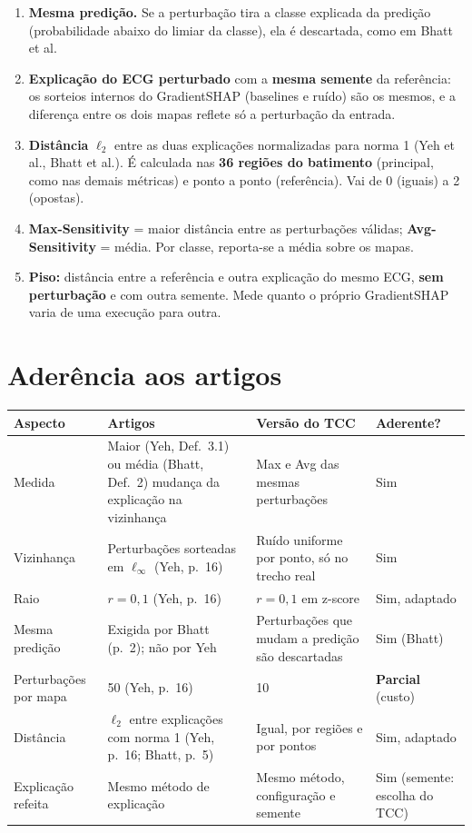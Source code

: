 \documentclass[11pt,a4paper]{article}
\begin{document}
\begin{enumerate}
\item \textbf{Mesma predição.} Se a perturbação tira a classe explicada da predição (probabilidade abaixo do limiar da classe), ela é descartada, como em Bhatt et al.
\item \textbf{Explicação do ECG perturbado} com a \textbf{mesma semente} da referência: os sorteios internos do GradientSHAP (baselines e ruído) são os mesmos, e a diferença entre os dois mapas reflete só a perturbação da entrada.
\item \textbf{Distância} $\ell_2$ entre as duas explicações normalizadas para norma 1 (Yeh et al., Bhatt et al.). É calculada nas \textbf{36 regiões do batimento} (principal, como nas demais métricas) e ponto a ponto (referência). Vai de 0 (iguais) a 2 (opostas).
\item \textbf{Max-Sensitivity} = maior distância entre as perturbações válidas; \textbf{Avg-Sensitivity} = média. Por classe, reporta-se a média sobre os mapas.
\item \textbf{Piso:} distância entre a referência e outra explicação do mesmo ECG, \textbf{sem perturbação} e com outra semente. Mede quanto o próprio GradientSHAP varia de uma execução para outra.
\end{enumerate}

\section{Aderência aos artigos}
\begin{center}\small
\begin{tabularx}{\linewidth}{lXXl}
\toprule
\textbf{Aspecto} & \textbf{Artigos} & \textbf{Versão do TCC} & \textbf{Aderente?} \\
\midrule
Medida & Maior (Yeh, Def.~3.1) ou média (Bhatt, Def.~2) mudança da explicação na vizinhança & Max e Avg das mesmas perturbações & Sim \\
\addlinespace
Vizinhança & Perturbações sorteadas em $\ell_\infty$ (Yeh, p.~16) & Ruído uniforme por ponto, só no trecho real & Sim \\
\addlinespace
Raio & $r = 0{,}1$ (Yeh, p.~16) & $r = 0{,}1$ em z-score & Sim, adaptado \\
\addlinespace
Mesma predição & Exigida por Bhatt (p.~2); não por Yeh & Perturbações que mudam a predição são descartadas & Sim (Bhatt) \\
\addlinespace
Perturbações por mapa & 50 (Yeh, p.~16) & 10 & \textbf{Parcial} (custo) \\
\addlinespace
Distância & $\ell_2$ entre explicações com norma 1 (Yeh, p.~16; Bhatt, p.~5) & Igual, por regiões e por pontos & Sim, adaptado \\
\addlinespace
Explicação refeita & Mesmo método de explicação & Mesmo método, configuração e semente & Sim (semente: escolha do TCC) \\
\bottomrule
\end{tabularx}
\end{center}
\end{document}

